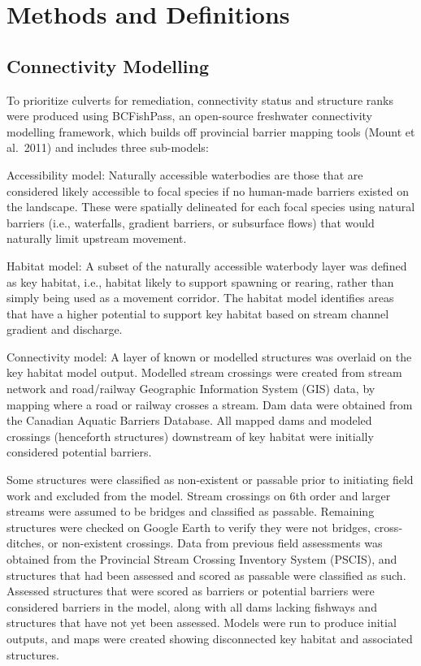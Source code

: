 \documentclass[
  letterpaper,
  DIV=11,
  numbers=noendperiod]{scrreprt}
\begin{document}

\hypertarget{methods-and-definitions}{%
\chapter{Methods and Definitions}\label{methods-and-definitions}}

\hypertarget{connectivity-modelling}{%
\section*{Connectivity Modelling}\label{connectivity-modelling}}


To prioritize culverts for remediation, connectivity status and
structure ranks were produced using BCFishPass, an open-source
freshwater connectivity modelling framework, which builds off provincial
barrier mapping tools (Mount et al.~2011) and includes three sub-models:

Accessibility model: Naturally accessible waterbodies are those that are
considered likely accessible to focal species if no human-made barriers
existed on the landscape. These were spatially delineated for each focal
species using natural barriers (i.e., waterfalls, gradient barriers, or
subsurface flows) that would naturally limit upstream movement.

Habitat model: A subset of the naturally accessible waterbody layer was
defined as key habitat, i.e., habitat likely to support spawning or
rearing, rather than simply being used as a movement corridor. The
habitat model identifies areas that have a higher potential to support
key habitat based on stream channel gradient and discharge.

Connectivity model: A layer of known or modelled structures was overlaid
on the key habitat model output. Modelled stream crossings were created
from stream network and road/railway Geographic Information System (GIS)
data, by mapping where a road or railway crosses a stream. Dam data were
obtained from the Canadian Aquatic Barriers Database. All mapped dams
and modeled crossings (henceforth structures) downstream of key habitat
were initially considered potential barriers.

Some structures were classified as non-existent or passable prior to
initiating field work and excluded from the model. Stream crossings on
6th order and larger streams were assumed to be bridges and classified
as passable. Remaining structures were checked on Google Earth to verify
they were not bridges, cross-ditches, or non-existent crossings. Data
from previous field assessments was obtained from the Provincial Stream
Crossing Inventory System (PSCIS), and structures that had been assessed
and scored as passable were classified as such. Assessed structures that
were scored as barriers or potential barriers were considered barriers
in the model, along with all dams lacking fishways and structures that
have not yet been assessed. Models were run to produce initial outputs,
and maps were created showing disconnected key habitat and associated
structures.
\end{document}
